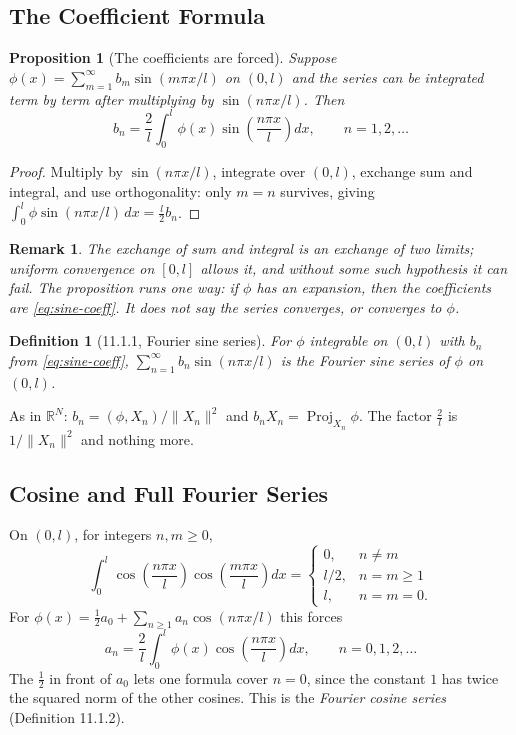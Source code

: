 \documentclass{article}
\newtheorem{definition}{Definition}
\newtheorem{remark}{Remark}
\newtheorem{proposition}{Proposition}
\newcommand{\R}{\mathbb{R}}
\begin{document}
\subsection{The Coefficient Formula}
\begin{proposition}[The coefficients are forced]
    Suppose $\phi(x) = \sum_{m=1}^\infty b_m\sin(m\pi x/l)$ on $(0,l)$ and the series can be integrated term by term after multiplying by $\sin(n\pi x/l)$. Then
    \begin{equation}\label{eq:sine-coeff}
        b_n = \frac{2}{l}\int_0^l \phi(x)\sin\left(\frac{n\pi x}{l}\right)dx, \qquad n = 1, 2, \dots
    \end{equation}
\end{proposition}
\begin{proof}
    Multiply by $\sin(n\pi x/l)$, integrate over $(0,l)$, exchange sum and integral, and use orthogonality: only $m = n$ survives, giving $\int_0^l\phi\sin(n\pi x/l)\,dx = \frac{l}{2}b_n$.
\end{proof}
\begin{remark}
    The exchange of sum and integral is an exchange of two limits; uniform convergence on $[0,l]$ allows it, and without some such hypothesis it can fail. The proposition runs one way: \emph{if} $\phi$ has an expansion, \emph{then} the coefficients are \eqref{eq:sine-coeff}. It does not say the series converges, or converges to $\phi$.
\end{remark}
\begin{definition}[11.1.1, Fourier sine series]
    For $\phi$ integrable on $(0,l)$ with $b_n$ from \eqref{eq:sine-coeff}, $\sum_{n=1}^\infty b_n\sin(n\pi x/l)$ is the Fourier sine series of $\phi$ on $(0,l)$.
\end{definition}
As in $\R^N$: $b_n = (\phi, X_n)/\|X_n\|^2$ and $b_nX_n = \operatorname{Proj}_{X_n}\phi$. The factor $\frac{2}{l}$ is $1/\|X_n\|^2$ and nothing more.

\subsection{Cosine and Full Fourier Series}
On $(0,l)$, for integers $n, m \geq 0$,
\begin{equation}
    \int_0^l \cos\left(\frac{n\pi x}{l}\right)\cos\left(\frac{m\pi x}{l}\right)dx = \begin{cases} 0, & n \neq m \\ l/2, & n = m \geq 1 \\ l, & n = m = 0. \end{cases}
\end{equation}
For $\phi(x) = \frac12 a_0 + \sum_{n\geq1} a_n\cos(n\pi x/l)$ this forces
\begin{equation}
    a_n = \frac{2}{l}\int_0^l \phi(x)\cos\left(\frac{n\pi x}{l}\right)dx, \qquad n = 0, 1, 2, \dots
\end{equation}
The $\frac12$ in front of $a_0$ lets one formula cover $n = 0$, since the constant $1$ has twice the squared norm of the other cosines. This is the \emph{Fourier cosine series} (Definition 11.1.2).
\end{document}
